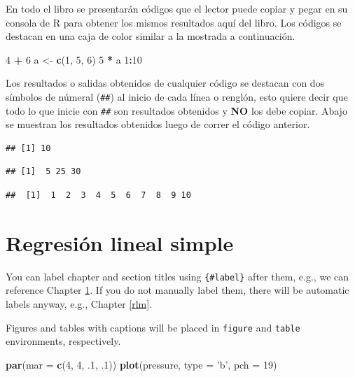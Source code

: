 \documentclass[]{book}
\makeatletter
\newenvironment{Shaded}{\begin{snugshade}}{\end{snugshade}}
\newcommand{\KeywordTok}[1]{\textcolor[rgb]{0.13,0.29,0.53}{\textbf{#1}}}
\newcommand{\DataTypeTok}[1]{\textcolor[rgb]{0.13,0.29,0.53}{#1}}
\newcommand{\DecValTok}[1]{\textcolor[rgb]{0.00,0.00,0.81}{#1}}
\newcommand{\StringTok}[1]{\textcolor[rgb]{0.31,0.60,0.02}{#1}}
\newcommand{\OperatorTok}[1]{\textcolor[rgb]{0.81,0.36,0.00}{\textbf{#1}}}
\newcommand{\NormalTok}[1]{#1}
\newenvironment{kframe}{%
  \medskip{}
  \setlength{\fboxsep}{.8em}
  \def\at@end@of@kframe{}%
  \ifinner\ifhmode%
  \def\at@end@of@kframe{\end{minipage}}%
  \begin{minipage}{\columnwidth}%
  \fi\fi%
  \def\FrameCommand##1{\hskip\@totalleftmargin \hskip-\fboxsep
  \colorbox{shadecolor}{##1}\hskip-\fboxsep
      \hskip-\linewidth \hskip-\@totalleftmargin \hskip\columnwidth}%
  \MakeFramed {\advance\hsize-\width
    \@totalleftmargin\z@ \linewidth\hsize
    \@setminipage}}%
{\par\unskip\endMakeFramed%
  \at@end@of@kframe}
\renewenvironment{Shaded}{\begin{kframe}}{\end{kframe}}
\makeatother
\begin{document}
En todo el libro se presentarán códigos que el lector puede copiar y
pegar en su consola de R para obtener los mismos resultados aquí del
libro. Los códigos se destacan en una caja de color similar a la
mostrada a continuación.

\begin{Shaded}
\begin{Highlighting}[]
\DecValTok{4} \OperatorTok{+}\StringTok{ }\DecValTok{6}
\NormalTok{a <-}\StringTok{ }\KeywordTok{c}\NormalTok{(}\DecValTok{1}\NormalTok{, }\DecValTok{5}\NormalTok{, }\DecValTok{6}\NormalTok{)}
\DecValTok{5} \OperatorTok{*}\StringTok{ }\NormalTok{a}
\DecValTok{1}\OperatorTok{:}\DecValTok{10}
\end{Highlighting}
\end{Shaded}

Los resultados o salidas obtenidos de cualquier código se destacan con
dos símbolos de númeral (\texttt{\#\#}) al inicio de cada línea o
renglón, esto quiere decir que todo lo que inicie con \texttt{\#\#} son
resultados obtenidos y \textbf{NO} los debe copiar. Abajo se muestran
los resultados obtenidos luego de correr el código anterior.

\begin{verbatim}
## [1] 10
\end{verbatim}

\begin{verbatim}
## [1]  5 25 30
\end{verbatim}

\begin{verbatim}
##  [1]  1  2  3  4  5  6  7  8  9 10
\end{verbatim}

\chapter{Regresión lineal simple}\label{rls}

You can label chapter and section titles using \texttt{\{\#label\}}
after them, e.g., we can reference Chapter \ref{rls}. If you do not
manually label them, there will be automatic labels anyway, e.g.,
Chapter \ref{rlm}.

Figures and tables with captions will be placed in \texttt{figure} and
\texttt{table} environments, respectively.

\begin{Shaded}
\begin{Highlighting}[]
\KeywordTok{par}\NormalTok{(}\DataTypeTok{mar =} \KeywordTok{c}\NormalTok{(}\DecValTok{4}\NormalTok{, }\DecValTok{4}\NormalTok{, .}\DecValTok{1}\NormalTok{, .}\DecValTok{1}\NormalTok{))}
\KeywordTok{plot}\NormalTok{(pressure, }\DataTypeTok{type =} \StringTok{'b'}\NormalTok{, }\DataTypeTok{pch =} \DecValTok{19}\NormalTok{)}
\end{Highlighting}
\end{Shaded}
\end{document}
